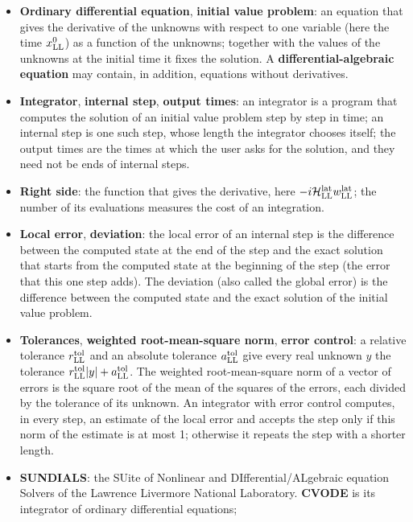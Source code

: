 \documentclass[
  10pt,
]{article}
\providecommand{\tightlist}{%
  \setlength{\itemsep}{0pt}\setlength{\parskip}{0pt}}
\begin{document}
\begin{itemize}
\tightlist
\item
  \textbf{Ordinary differential equation}, \textbf{initial value
  problem}: an equation that gives the derivative of the unknowns with
  respect to one variable (here the time \(x^0_{\rm LL}\)) as a function
  of the unknowns; together with the values of the unknowns at the
  initial time it fixes the solution. A \textbf{differential-algebraic
  equation} may contain, in addition, equations without derivatives.
\item
  \textbf{Integrator}, \textbf{internal step}, \textbf{output times}: an
  integrator is a program that computes the solution of an initial value
  problem step by step in time; an internal step is one such step, whose
  length the integrator chooses itself; the output times are the times
  at which the user asks for the solution, and they need not be ends of
  internal steps.
\item
  \textbf{Right side}: the function that gives the derivative, here
  \(-i\mathcal H^{\rm lat}_{\rm LL}w^{\rm lat}_{\rm LL}\); the number of
  its evaluations measures the cost of an integration.
\item
  \textbf{Local error}, \textbf{deviation}: the local error of an
  internal step is the difference between the computed state at the end
  of the step and the exact solution that starts from the computed state
  at the beginning of the step (the error that this one step adds). The
  deviation (also called the global error) is the difference between the
  computed state and the exact solution of the initial value problem.
\item
  \textbf{Tolerances}, \textbf{weighted root-mean-square norm},
  \textbf{error control}: a relative tolerance \(r^{\rm tol}_{\rm LL}\)
  and an absolute tolerance \(a^{\rm tol}_{\rm LL}\) give every real
  unknown \(y\) the tolerance
  \(r^{\rm tol}_{\rm LL}\lvert y\rvert+a^{\rm tol}_{\rm LL}\). The
  weighted root-mean-square norm of a vector of errors is the square
  root of the mean of the squares of the errors, each divided by the
  tolerance of its unknown. An integrator with error control computes,
  in every step, an estimate of the local error and accepts the step
  only if this norm of the estimate is at most 1; otherwise it repeats
  the step with a shorter length.
\item
  \textbf{SUNDIALS}: the SUite of Nonlinear and DIfferential/ALgebraic
  equation Solvers of the Lawrence Livermore National Laboratory.
  \textbf{CVODE} is its integrator of ordinary differential equations;

\end{itemize}
\end{document}
